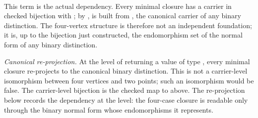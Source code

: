 \documentclass[11pt]{article}
\begin{document}
\begin{code}
\<%
\\
\>[0]\AgdaSpace{}%
\AgdaSpace{}%
\AgdaSymbol{=}\AgdaSpace{}%
\<%
\\
\>[0][@{}l@{\AgdaIndent{0}}]%
\>[2]\AgdaSymbol{\{}\AgdaSpace{}%
%
\>[12]\AgdaSymbol{=}\AgdaSpace{}%
%
\>[46]\AgdaSymbol{(}\AgdaSpace{}%
\AgdaSymbol{)}\<%
\\
%
\>[2]\AgdaSymbol{;}\AgdaSpace{}%
%
\>[12]\AgdaSymbol{=}\AgdaSpace{}%
%
\>[46]\AgdaSymbol{(}\AgdaSpace{}%
\AgdaSymbol{)}\<%
\\
%
\>[2]\AgdaSymbol{;}\AgdaSpace{}%
\AgdaSpace{}%
\AgdaSymbol{=}\AgdaSpace{}%
\AgdaSpace{}%
\AgdaSymbol{(}\AgdaSpace{}%
\AgdaSymbol{)}\<%
\\
%
\>[2]\AgdaSymbol{;}\AgdaSpace{}%
\AgdaSpace{}%
\AgdaSymbol{=}\AgdaSpace{}%
\AgdaSpace{}%
\<%
\\
%
\>[2]\AgdaSymbol{\}}\<%
\end{code}

This term is the actual dependency.  Every minimal closure has a
carrier in checked bijection with ; by
,  is built from
, the canonical carrier of any binary distinction.
The four-vertex structure is therefore not an independent foundation;
it is, up to the bijection just constructed, the endomorphism set of
the normal form of any binary distinction.

\emph{Canonical re-projection.}  At the level of returning a value of
type , every minimal closure re-projects to
the canonical binary distinction.  This is not a carrier-level
isomorphism between four vertices and two points; such an isomorphism
would be false.  The carrier-level bijection is the checked map to
 above.  The re-projection below records the
dependency at the  level: the four-case closure
is readable only through the binary normal form whose endomorphisms it
represents.
\end{document}
